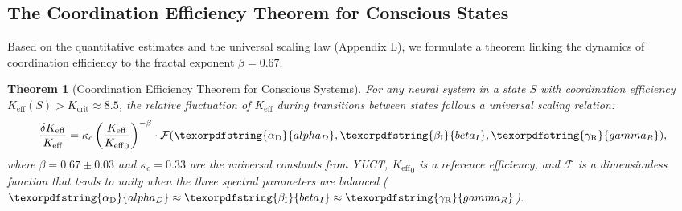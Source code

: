 \documentclass[12pt,a4paper]{article}
\newtheorem{theorem}{Theorem}
\DeclareRobustCommand{\alD}{\texorpdfstring{\ensuremath{\alpha_{\mathrm{D}}}}{alpha_D}}
\DeclareRobustCommand{\beI}{\texorpdfstring{\ensuremath{\beta_{\mathrm{I}}}}{beta_I}}
\DeclareRobustCommand{\gaR}{\texorpdfstring{\ensuremath{\gamma_{\mathrm{R}}}}{gamma_R}}
\newcommand{\Ke}{K_{\mathrm{eff}}}
\newcommand{\Kcrit}{K_{\mathrm{crit}}}
\begin{document}
	\subsection{The Coordination Efficiency Theorem for Conscious States}
	\label{subsec:keff_theorem}
	
	Based on the quantitative estimates and the universal scaling law (Appendix L), we formulate a theorem linking the dynamics of coordination efficiency to the fractal exponent \(\beta = 0.67\).
	
	\begin{theorem}[Coordination Efficiency Theorem for Conscious Systems]
		For any neural system in a state \(S\) with coordination efficiency \(\Ke(S) > \Kcrit \approx 8.5\), the relative fluctuation of \(\Ke\) during transitions between states follows a universal scaling relation:
		\begin{equation}
			\frac{\delta \Ke}{\Ke} = \kappa_c \left( \frac{\Ke}{{\Ke}_{0}} \right)^{-\beta} \cdot \mathcal{F}(\alD, \beI, \gaR),
			\label{eq:keff_scaling_theorem}
		\end{equation}
		where \(\beta = 0.67 \pm 0.03\) and \(\kappa_c = 0.33\) are the universal constants from YUCT, \({\Ke}_{0}\) is a reference efficiency, and \(\mathcal{F}\) is a dimensionless function that tends to unity when the three spectral parameters are balanced (\(\alD \approx \beI \approx \gaR\)).
	\end{theorem}
	
\end{document}
